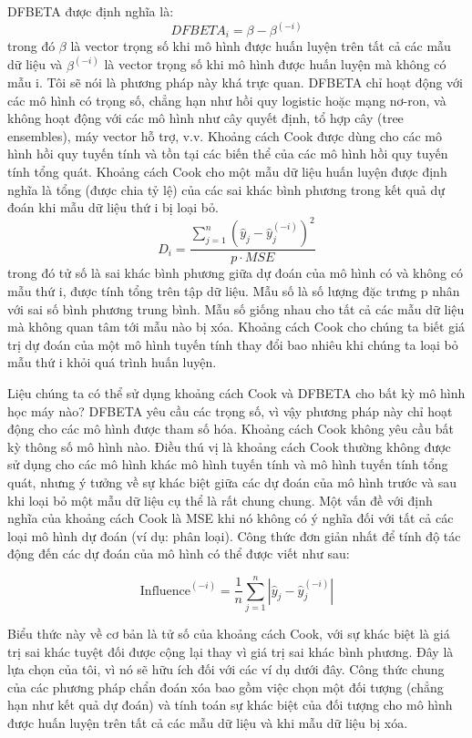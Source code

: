 DFBETA được định nghĩa là: 
$$DFBETA_{i}=\beta-\beta^{(-i)}$$
trong đó $\beta$ là vector trọng số khi mô hình được huấn luyện trên tất cả các mẫu dữ liệu và $\beta^{(-i)}$ là vector trọng số khi mô hình được huấn luyện mà không có mẫu i. Tôi sẽ nói là phương pháp này khá trực quan. DFBETA chỉ hoạt động với các mô hình có trọng số, chẳng hạn như hồi quy logistic hoặc mạng nơ-ron, và không hoạt động với các mô hình như cây quyết định, tổ hợp cây (tree ensembles),  máy vector hỗ trợ, v.v. Khoảng cách Cook được dùng cho các mô hình hồi quy tuyến tính và tồn tại các biến thể của các mô hình hồi quy tuyến tính tổng quát. Khoảng cách Cook cho một mẫu dữ liệu huấn luyện được định nghĩa là tổng (được chia tỷ lệ) của các sai khác bình phương trong kết quả dự đoán khi mẫu dữ liệu thứ i bị loại bỏ.
$$D_i=\frac{\sum_{j=1}^n(\hat{y}_j-\hat{y}_{j}^{(-i)})^2}{p\cdot{}MSE}$$
trong đó tử số là sai khác bình phương giữa dự đoán của mô hình có và không có mẫu thứ i, được tính tổng trên tập dữ liệu. Mẫu số là số lượng đặc trưng p nhân với sai số bình phương trung bình. Mẫu số giống nhau cho tất cả các mẫu dữ liệu mà không quan tâm tới mẫu nào bị xóa. Khoảng cách Cook cho chúng ta biết giá trị dự đoán của một mô hình tuyến tính thay đổi bao nhiêu khi chúng ta loại bỏ mẫu thứ i khỏi quá trình huấn luyện.

Liệu chúng ta có thể sử dụng khoảng cách Cook và DFBETA cho bất kỳ mô hình học máy nào? DFBETA yêu cầu các trọng số, vì vậy phương pháp này chỉ hoạt động cho các mô hình được tham số hóa. Khoảng cách Cook không yêu cầu bất kỳ thông số mô hình nào. Điều thú vị là khoảng cách Cook thường không được sử dụng cho các mô hình khác mô hình tuyến tính và mô hình tuyến tính tổng quát, nhưng ý tưởng về sự khác biệt giữa các dự đoán của mô hình trước và sau khi loại bỏ một mẫu dữ liệu cụ thể là rất chung chung. Một vấn đề với định nghĩa của khoảng cách Cook là MSE khi nó không có ý nghĩa đối với tất cả các loại mô hình dự đoán (ví dụ: phân loại). Công thức đơn giản nhất để tính độ tác động đến các dự đoán của mô hình có thể được viết như sau:

$$\text{Influence}^{(-i)}=\frac{1}{n}\sum_{j=1}^{n}\left|\hat{y}_j-\hat{y}_{j}^{(-i)}\right|$$

Biểu thức này về cơ bản là tử số của khoảng cách Cook, với sự khác biệt là giá trị sai khác tuyệt đối được cộng lại thay vì giá trị sai khác bình phương. Đây là lựa chọn của tôi, vì nó sẽ hữu ích đối với các ví dụ dưới đây. Công thức chung của các phương pháp chẩn đoán xóa bao gồm việc chọn một đối tượng (chẳng hạn như kết quả dự đoán) và tính toán sự khác biệt của đối tượng cho mô hình được huấn luyện trên tất cả các mẫu dữ liệu và khi mẫu dữ liệu bị xóa.

